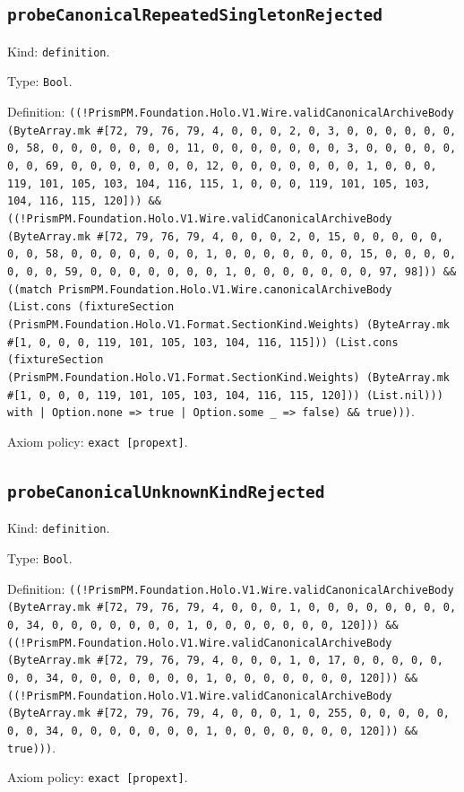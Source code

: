 \documentclass[11pt]{article}
\begin{document}
\subsection*{\texttt{probeCanonicalRepeatedSingletonRejected}}
\noindent Kind: \texttt{definition}.\par
\noindent Type: \texttt{Bool}.\par
\noindent Definition: \texttt{((!PrismPM.Foundation.Holo.V1.Wire.validCanonicalArchiveBody (ByteArray.mk \#[72, 79, 76, 79, 4, 0, 0, 0, 2, 0, 3, 0, 0, 0, 0, 0, 0, 0, 58, 0, 0, 0, 0, 0, 0, 0, 11, 0, 0, 0, 0, 0, 0, 0, 3, 0, 0, 0, 0, 0, 0, 0, 69, 0, 0, 0, 0, 0, 0, 0, 12, 0, 0, 0, 0, 0, 0, 0, 1, 0, 0, 0, 119, 101, 105, 103, 104, 116, 115, 1, 0, 0, 0, 119, 101, 105, 103, 104, 116, 115, 120])) \&\& ((!PrismPM.Foundation.Holo.V1.Wire.validCanonicalArchiveBody (ByteArray.mk \#[72, 79, 76, 79, 4, 0, 0, 0, 2, 0, 15, 0, 0, 0, 0, 0, 0, 0, 58, 0, 0, 0, 0, 0, 0, 0, 1, 0, 0, 0, 0, 0, 0, 0, 15, 0, 0, 0, 0, 0, 0, 0, 59, 0, 0, 0, 0, 0, 0, 0, 1, 0, 0, 0, 0, 0, 0, 0, 97, 98])) \&\& ((match PrismPM.Foundation.Holo.V1.Wire.canonicalArchiveBody (List.cons (fixtureSection (PrismPM.Foundation.Holo.V1.Format.SectionKind.Weights) (ByteArray.mk \#[1, 0, 0, 0, 119, 101, 105, 103, 104, 116, 115])) (List.cons (fixtureSection (PrismPM.Foundation.Holo.V1.Format.SectionKind.Weights) (ByteArray.mk \#[1, 0, 0, 0, 119, 101, 105, 103, 104, 116, 115, 120])) (List.nil))) with | Option.none => true | Option.some \_ => false) \&\& true)))}.\par
\noindent Axiom policy: \texttt{exact [propext]}.\par
\subsection*{\texttt{probeCanonicalUnknownKindRejected}}
\noindent Kind: \texttt{definition}.\par
\noindent Type: \texttt{Bool}.\par
\noindent Definition: \texttt{((!PrismPM.Foundation.Holo.V1.Wire.validCanonicalArchiveBody (ByteArray.mk \#[72, 79, 76, 79, 4, 0, 0, 0, 1, 0, 0, 0, 0, 0, 0, 0, 0, 0, 34, 0, 0, 0, 0, 0, 0, 0, 1, 0, 0, 0, 0, 0, 0, 0, 120])) \&\& ((!PrismPM.Foundation.Holo.V1.Wire.validCanonicalArchiveBody (ByteArray.mk \#[72, 79, 76, 79, 4, 0, 0, 0, 1, 0, 17, 0, 0, 0, 0, 0, 0, 0, 34, 0, 0, 0, 0, 0, 0, 0, 1, 0, 0, 0, 0, 0, 0, 0, 120])) \&\& ((!PrismPM.Foundation.Holo.V1.Wire.validCanonicalArchiveBody (ByteArray.mk \#[72, 79, 76, 79, 4, 0, 0, 0, 1, 0, 255, 0, 0, 0, 0, 0, 0, 0, 34, 0, 0, 0, 0, 0, 0, 0, 1, 0, 0, 0, 0, 0, 0, 0, 120])) \&\& true)))}.\par
\noindent Axiom policy: \texttt{exact [propext]}.\par
\end{document}
